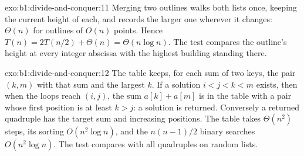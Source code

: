 \begin{solution}{exo:b1:divide-and-conquer:11}
Merging two outlines walks both lists once, keeping the current height of each, and records the larger one wherever it
changes: $\Theta(n)$ for outlines of $O(n)$ points. Hence $T(n) = 2T(n/2) + \Theta(n) = \Theta(n \log n)$. The test
compares the outline's height at every integer abscissa with the highest building standing there.
\end{solution}

\begin{solution}{exo:b1:divide-and-conquer:12}
The table keeps, for each sum of two keys, the pair $(k, m)$ with that sum and the largest $k$. If a solution $i < j < k
< m$ exists, then when the loops reach $(i, j)$, the sum $a[k] + a[m]$ is in the table with a pair whose first position
is at least $k > j$: a solution is returned. Conversely a returned quadruple has the target sum and increasing positions.
The table takes $\Theta(n^2)$ steps, its sorting $O(n^2 \log n)$, and the $n(n - 1)/2$ binary searches $O(n^2 \log
n)$. The test compares with all quadruples on random lists.
\end{solution}

